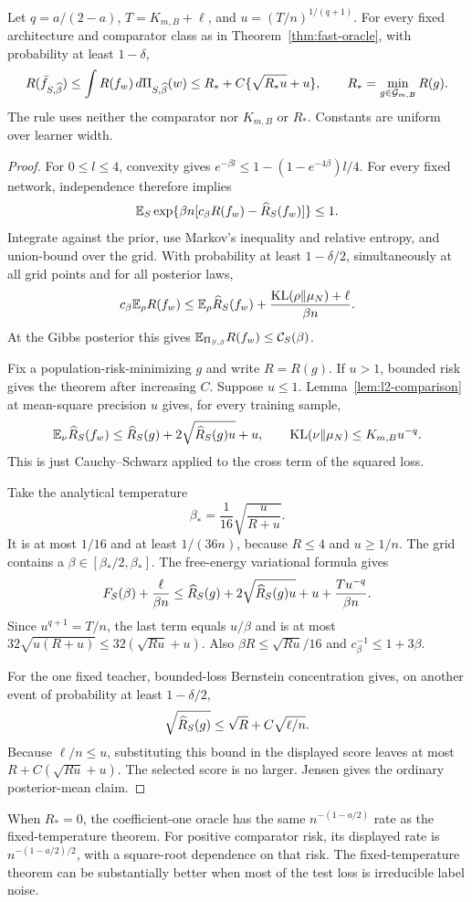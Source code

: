 \begin{theorem}\label{thm:coefficient-one}
Let $q=a/(2-a)$, $T=K_{m,B}+\ell$, and $u=(T/n)^{1/(q+1)}$.
For every fixed architecture and comparator class as in Theorem~\ref{thm:fast-oracle}, with probability at least $1-\delta$,
\begin{equation}
 R(\bar f_{S,\widehat\beta})
 \le \int R(f_w)\,d\Pi_{S,\widehat\beta}(w)
 \le R_*+C\{\sqrt{R_*u}+u\},
 \qquad R_*=\min_{g\in\mathcal G_{m,B}}R(g).
 \label{eq:coefficient-one}
\end{equation}
The rule uses neither the comparator nor $K_{m,B}$ or $R_*$. Constants are uniform over learner width.
\end{theorem}
\begin{proof}
For $0\le l\le4$, convexity gives
$e^{-\beta l}\le1-(1-e^{-4\beta})l/4$.
For every fixed network, independence therefore implies
\[
 \mathbb E_S\exp\{\beta n[c_\beta R(f_w)-\widehat R_S(f_w)]\}\le1.
\]
Integrate against the prior, use Markov's inequality and relative entropy, and union-bound over the grid. With probability at least $1-\delta/2$, simultaneously at all grid points and for all posterior laws,
\[
 c_\beta\mathbb E_\rho R(f_w)\le\mathbb E_\rho\widehat R_S(f_w)
       +\frac{\operatorname{KL}(\rho\|\mu_N)+\ell}{\beta n}.
\]
At the Gibbs posterior this gives $\mathbb E_{\Pi_{S,\beta}}R(f_w)\le\mathcal C_S(\beta)$.

Fix a population-risk-minimizing $g$ and write $R=R(g)$. If $u>1$, bounded risk gives the theorem after increasing $C$. Suppose $u\le1$. Lemma~\ref{lem:l2-comparison} at mean-square precision $u$ gives, for every training sample,
\[
 \mathbb E_\nu\widehat R_S(f_w)
 \le\widehat R_S(g)+2\sqrt{\widehat R_S(g)u}+u,
 \qquad \operatorname{KL}(\nu\|\mu_N)\le K_{m,B}u^{-q}.
\]
This is just Cauchy--Schwarz applied to the cross term of the squared loss.

Take the analytical temperature
\[
 \beta_*=\frac1{16}\sqrt{\frac u{R+u}}.
\]
It is at most $1/16$ and at least $1/(36n)$, because $R\le4$ and $u\ge1/n$. The grid contains a $\beta\in[\beta_*/2,\beta_*]$.
The free-energy variational formula gives
\[
 F_S(\beta)+\frac\ell{\beta n}
 \le\widehat R_S(g)+2\sqrt{\widehat R_S(g)u}+u+\frac{T u^{-q}}{\beta n}.
\]
Since $u^{q+1}=T/n$, the last term equals $u/\beta$ and is at most
$32\sqrt{u(R+u)}\le32(\sqrt{Ru}+u)$.
Also $\beta R\le\sqrt{Ru}/16$ and $c_\beta^{-1}\le1+3\beta$.

For the one fixed teacher, bounded-loss Bernstein concentration gives, on another event of probability at least $1-\delta/2$,
\[
 \sqrt{\widehat R_S(g)}\le\sqrt R+C\sqrt{\ell/n}.
\]
Because $\ell/n\le u$, substituting this bound in the displayed score leaves at most $R+C(\sqrt{Ru}+u)$. The selected score is no larger. Jensen gives the ordinary posterior-mean claim.
\end{proof}

When $R_*=0$, the coefficient-one oracle has the same $n^{-(1-a/2)}$ rate as the fixed-temperature theorem. For positive comparator risk, its displayed rate is $n^{-(1-a/2)/2}$, with a square-root dependence on that risk. The fixed-temperature theorem can be substantially better when most of the test loss is irreducible label noise.
